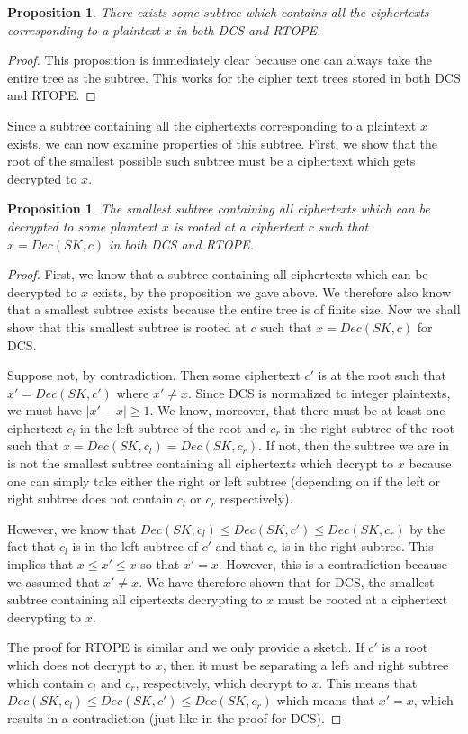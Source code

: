 \documentclass[12pt]{article}
\newtheorem{proposition}[theorem]{Proposition}
\begin{document}
\begin{proposition}
  There exists some subtree which contains all the ciphertexts corresponding to a plaintext $x$ in both DCS and RTOPE.
\end{proposition}
\begin{proof}
  This proposition is immediately clear because one can always take the entire tree as the subtree. This works for the cipher text trees stored in both DCS and RTOPE.
\end{proof}

Since a subtree containing all the ciphertexts corresponding to a plaintext $x$ exists, we can now examine properties of this subtree. First, we show that the root of the smallest possible such subtree must be a ciphertext which gets decrypted to $x$.

\begin{proposition}
  The smallest subtree containing all ciphertexts which can be decrypted to some plaintext $x$ is rooted at a ciphertext $c$ such that $x = Dec(SK, c)$ in both DCS and RTOPE.
\end{proposition}
\begin{proof}
  First, we know that a subtree containing all ciphertexts which can be decrypted to $x$ exists, by the proposition we gave above. We therefore also know that a smallest subtree exists because the entire tree is of finite size. Now we shall show that this smallest subtree is rooted at $c$ such that $x = Dec(SK, c)$ for DCS.

  Suppose not, by contradiction. Then some ciphertext $c'$ is at the root such that $x' = Dec(SK, c')$ where $x' \neq x$. Since DCS is normalized to integer plaintexts, we must have $|x' - x| \geq 1$. We know, moreover, that there must be at least one ciphertext $c_l$ in the left subtree of the root and $c_r$ in the right subtree of the root such that $x = Dec(SK, c_l) = Dec(SK, c_r)$. If not, then the subtree we are in is not the smallest subtree containing all ciphertexts which decrypt to $x$ because one can simply take either the right or left subtree (depending on if the left or right subtree does not contain $c_l$ or $c_r$ respectively).

  However, we know that $Dec(SK, c_l) \leq Dec(SK, c') \leq Dec(SK, c_r)$ by the fact that $c_l$ is in the left subtree of $c'$ and that $c_r$ is in the right subtree. This implies that $x \leq x' \leq x$ so that $x' = x$. However, this is a contradiction because we assumed that $x' \neq x$. We have therefore shown that for DCS, the smallest subtree containing all cipertexts decrypting to $x$ must be rooted at a ciphertext decrypting to $x$.

  The proof for RTOPE is similar and we only provide a sketch. If $c'$ is a root which does not decrypt to $x$, then it must be separating a left and right subtree which contain $c_l$ and $c_r$, respectively, which decrypt to $x$. This means that $Dec(SK, c_l) \leq Dec(SK, c') \leq Dec(SK, c_r)$ which means that $x' = x$, which results in a contradiction (just like in the proof for DCS).
\end{proof}
\end{document}
